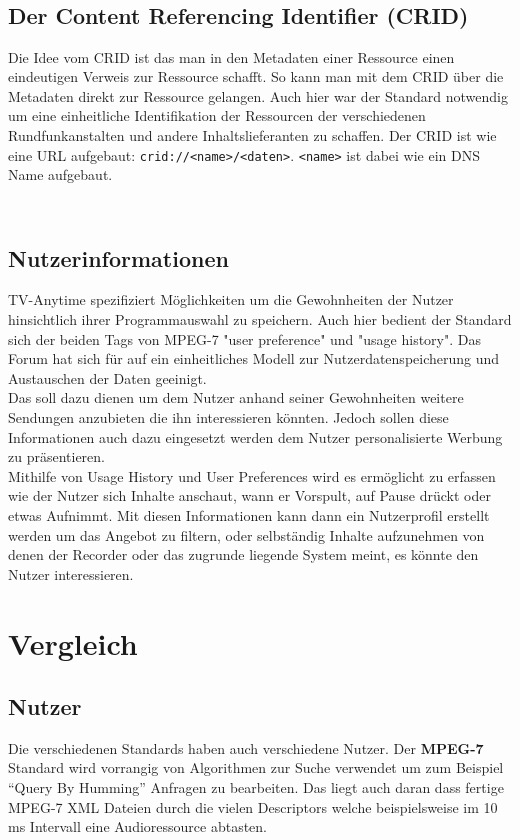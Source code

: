  \subsection{\\Der Content Referencing Identifier (CRID)\\}
Die Idee vom CRID ist das man in den Metadaten einer Ressource einen eindeutigen Verweis zur Ressource schafft. So kann man mit dem CRID über die Metadaten direkt zur Ressource gelangen. Auch hier war der Standard notwendig um eine einheitliche Identifikation der Ressourcen der verschiedenen Rundfunkanstalten und andere Inhaltslieferanten zu schaffen. Der CRID ist wie eine URL aufgebaut: \texttt{crid://<name>/<daten>}. \texttt{<name>} ist dabei wie ein DNS Name aufgebaut.
\subsection{\\Nutzerinformationen\\} 
TV-Anytime spezifiziert Möglichkeiten um die Gewohnheiten der Nutzer hinsichtlich ihrer Programmauswahl zu speichern. Auch hier bedient der Standard sich der beiden Tags von MPEG-7 "user preference" und "usage history". Das Forum hat sich für auf ein einheitliches Modell zur Nutzerdatenspeicherung und Austauschen der Daten geeinigt.\\Das soll dazu dienen um dem Nutzer anhand seiner Gewohnheiten weitere Sendungen anzubieten die ihn interessieren könnten. Jedoch sollen diese Informationen auch dazu eingesetzt werden dem Nutzer personalisierte Werbung zu präsentieren.\\
Mithilfe von Usage History und User Preferences wird es ermöglicht zu erfassen wie der Nutzer sich Inhalte anschaut, wann er Vorspult, auf Pause drückt oder etwas Aufnimmt. Mit diesen Informationen kann dann ein Nutzerprofil erstellt werden um das Angebot zu filtern, oder selbständig Inhalte aufzunehmen von denen der Recorder oder das zugrunde liegende System meint, es könnte den Nutzer interessieren.
	\newpage
	\section{Vergleich}
	\subsection{Nutzer}
	Die verschiedenen Standards haben auch verschiedene Nutzer. Der \textbf{MPEG-7} Standard wird vorrangig von Algorithmen zur Suche verwendet um zum Beispiel \enquote{Query By Humming} Anfragen zu bearbeiten. Das liegt auch daran dass fertige MPEG-7 XML Dateien durch die vielen Descriptors welche beispielsweise im 10 ms Intervall eine Audioressource abtasten.
	
